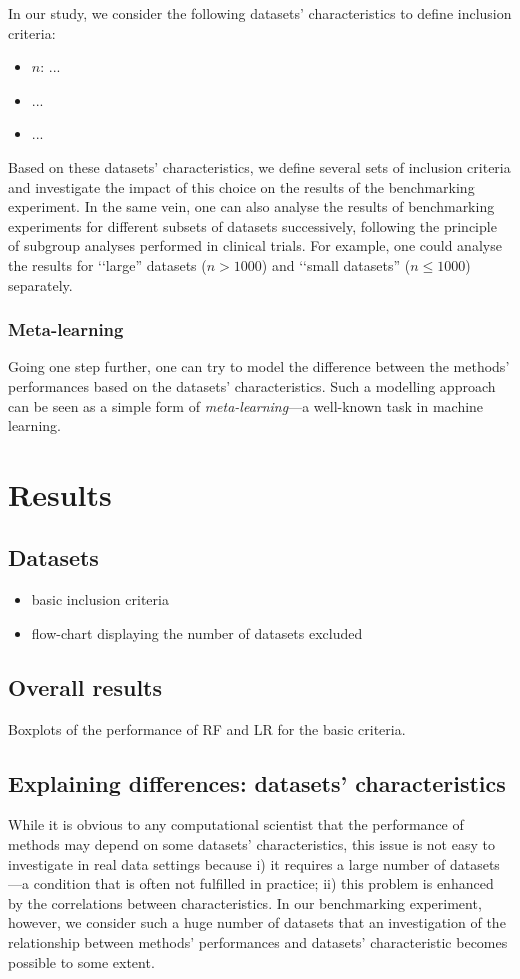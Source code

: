 \documentclass[12pt]{article}
\begin{document}
In our study, we consider the following datasets' characteristics to define inclusion criteria:
\begin{itemize}
\item $n$: ...
\item ...
\item ...
\end{itemize}
Based on these datasets' characteristics, we define several sets of inclusion criteria and investigate the impact of this choice on the results of the benchmarking experiment. In the same vein, one can also analyse the results of benchmarking experiments for different subsets of datasets successively, following the principle of subgroup analyses performed in clinical trials. For example, one could analyse the results for \lq\lq large'' datasets ($n>1000$) and \lq\lq small datasets'' ($n\leq 1000$) separately.


\subsubsection{Meta-learning}
Going one step further, one can try to model the difference between the methods' performances based on the datasets' characteristics. Such a modelling approach can be seen as a simple form of {\it meta-learning}---a well-known task in machine learning.


\section{Results}
\subsection{Datasets}
\begin{itemize}
\item basic inclusion criteria
\item flow-chart displaying the number of datasets excluded
\end{itemize}

\subsection{Overall results}
Boxplots of the performance of RF and LR for the basic criteria.

\subsection{Explaining differences: datasets' characteristics}
While it is obvious to any computational scientist that the performance of methods may depend on some datasets' characteristics, this issue is not easy to investigate in real data settings because i) it requires a large number of datasets---a condition that is often not fulfilled in practice; ii) this problem is enhanced by the correlations between characteristics. In our benchmarking experiment, however, we consider such a huge number of datasets that an investigation of the relationship between methods' performances and datasets' characteristic becomes possible to some extent. 
\end{document}
